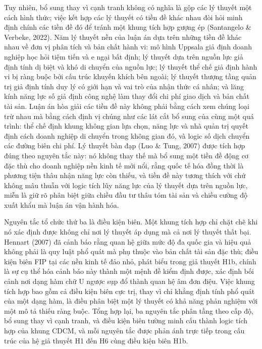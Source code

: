 \documentclass[
  a4paper,
  13pt]{extreport}
\begin{document}
Tuy nhiên, bổ sung thay vì cạnh tranh không có nghĩa là gộp các lý
thuyết một cách hình thức; việc kết hợp các lý thuyết có tiền đề khác
nhau đòi hỏi minh định chính các tiền đề đó để tránh một khung tích hợp
gượng ép (Santangelo \& Verbeke, 2022). Năm lý thuyết nền của luận án
dựa trên những tiền đề khác nhau về đơn vị phân tích và bản chất hành
vi: mô hình Uppsala giả định doanh nghiệp học hỏi tiệm tiến và e ngại
bất định; lý thuyết dựa trên nguồn lực giả định tính dị biệt và khó di
chuyển của nguồn lực; lý thuyết thể chế giả định hành vi bị ràng buộc
bởi cấu trúc khuyến khích bên ngoài; lý thuyết thượng tầng quản trị giả
định tính duy lý có giới hạn và vai trò của nhận thức cá nhân; và lăng
kính năng lực số giả định công nghệ làm thay đổi chi phí giao dịch và
bản chất tài sản. Luận án hòa giải các tiền đề này không phải bằng cách
xem chúng loại trừ nhau mà bằng cách định vị chúng như các lát cắt bổ
sung của cùng một quá trình: thể chế định khung không gian lựa chọn,
năng lực và nhà quản trị quyết định cách doanh nghiệp di chuyển trong
không gian đó, và logic số dịch chuyển các đường biên chi phí. Lý thuyết
bàn đạp (Luo \& Tung, 2007) được tích hợp đúng theo nguyên tắc này: nó
không thay thế mà bổ sung một tiền đề động cơ đặc thù cho doanh nghiệp
nền kinh tế mới nổi, rằng quốc tế hóa đồng thời là phương tiện thâu nhận
năng lực còn thiếu, và tiền đề này tương thích với chứ không mâu thuẫn
với logic tích lũy năng lực của lý thuyết dựa trên nguồn lực, miễn là
giữ rõ phân biệt giữa chiều đầu tư thâu tóm tài sản và chiều cường độ
xuất khẩu mà luận án vận hành hóa.

Nguyên tắc tổ chức thứ ba là điều kiện biên. Một khung tích hợp chỉ chặt
chẽ khi nó xác định được không chỉ nơi lý thuyết áp dụng mà cả nơi lý
thuyết thất bại. Hennart (2007) đã cảnh báo rằng quan hệ giữa mức độ đa
quốc gia và hiệu quả không phải là quy luật phổ quát mà phụ thuộc vào
bản chất tài sản đặc thù; điều kiện biên FIP tại các nền kinh tế đảo
nhỏ, phát biểu trong giả thuyết H1b, chính là sự cụ thể hóa cảnh báo này
thành một mệnh đề kiểm định được, xác định bối cảnh nơi dạng hàm chữ U
ngược sụp đổ thành quan hệ âm đơn điệu. Việc khung tích hợp bao gồm cả
điều kiện biên cực trị, thay vì chỉ khẳng định tính phổ quát của một
dạng hàm, là điều phân biệt một lý thuyết có khả năng phản nghiệm với
một mô tả thiếu ràng buộc. Tổng hợp lại, ba nguyên tắc phân tầng theo
cấp độ, bổ sung thay vì cạnh tranh, và điều kiện biên tường minh cấu
thành logic tích hợp của khung CDCM, và mỗi nguyên tắc được phản ánh
trực tiếp trong cấu trúc của hệ giả thuyết H1 đến H6 cùng điều kiện biên
H1b.
\end{document}

